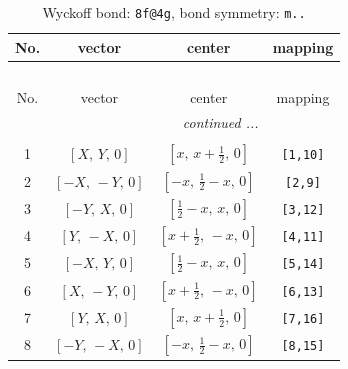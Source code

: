 \documentclass[fleqn,8pt]{jsarticle}
\begin{document}
\begin{longtable}{cccc}
\caption{Wyckoff bond: {\tt 8f@4g}, bond symmetry: {\tt m..}}
 \\
 \hline \hline
No. & vector & center & mapping \\ \hline \endfirsthead

\multicolumn{3}{l}{\tablename\ \thetable{}} \\
 \hline \hline
No. & vector & center & mapping \\ \hline \endhead

 \hline \hline
\multicolumn{3}{r}{\footnotesize\it continued ...} \\ \endfoot

 \hline \hline
\multicolumn{3}{r}{} \\ \endlastfoot

1 & $\left[ X,\, Y,\, 0 \right]$ & $\left[ x,\, x + \frac{1}{2},\, 0 \right]$ & {\tt [1,10]} \\ \hline
2 & $\left[ - X,\, - Y,\, 0 \right]$ & $\left[ - x,\, \frac{1}{2} - x,\, 0 \right]$ & {\tt [2,9]} \\ \hline
3 & $\left[ - Y,\, X,\, 0 \right]$ & $\left[ \frac{1}{2} - x,\, x,\, 0 \right]$ & {\tt [3,12]} \\ \hline
4 & $\left[ Y,\, - X,\, 0 \right]$ & $\left[ x + \frac{1}{2},\, - x,\, 0 \right]$ & {\tt [4,11]} \\ \hline
5 & $\left[ - X,\, Y,\, 0 \right]$ & $\left[ \frac{1}{2} - x,\, x,\, 0 \right]$ & {\tt [5,14]} \\ \hline
6 & $\left[ X,\, - Y,\, 0 \right]$ & $\left[ x + \frac{1}{2},\, - x,\, 0 \right]$ & {\tt [6,13]} \\ \hline
7 & $\left[ Y,\, X,\, 0 \right]$ & $\left[ x,\, x + \frac{1}{2},\, 0 \right]$ & {\tt [7,16]} \\ \hline
8 & $\left[ - Y,\, - X,\, 0 \right]$ & $\left[ - x,\, \frac{1}{2} - x,\, 0 \right]$ & {\tt [8,15]} \\
\end{longtable}
\renewcommand{\arraystretch}{1.2}
\end{document}
